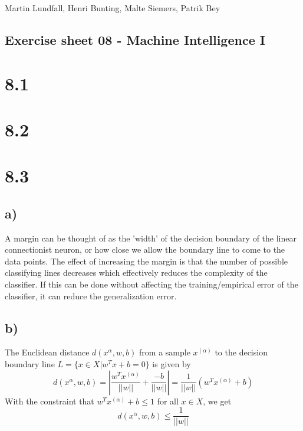 \documentclass[11pt,a4paper]{article}
\begin{document}
\noindent
Martin Lundfall, Henri Bunting, Malte Siemers, Patrik Bey
\begin{centering}
  \section*{Exercise sheet 08 - Machine Intelligence I}
  \end{centering}
\section*{8.1}
\section*{8.2}
\section*{8.3}
\subsection*{a)}
A margin can be thought of as the 'width' of the decision boundary of the linear connectionist neuron, or how close we allow the boundary line to come to the data points. The effect of increasing the margin is that the number of possible classifying lines decreases which effectively reduces the complexity of the classifier. If this can be done without affecting the training/empirical error of the classifier, it can reduce the generalization error.
\subsection*{b)}
The Euclidean distance $d(x^\alpha,w,b)$ from a sample $x^{(\alpha)}$ to the decision boundary line $L = \{ x \in X | w^Tx + b = 0\}$ is given by 
\begin{equation}
d(x^\alpha,w,b) = |\frac{w^Tx^{(\alpha)}}{||w||}+\frac{- b}{||w||}| = \frac{1}{||w||}\left ( w^Tx^{(\alpha)} + b \right )
\end{equation}
With the constraint that $w^Tx^{(\alpha)} + b \leq 1$ for all $x \in X$, we get 
\begin{equation}
d(x^\alpha,w,b) \leq \frac{1}{||w||}
\end{equation}
\end{document}
